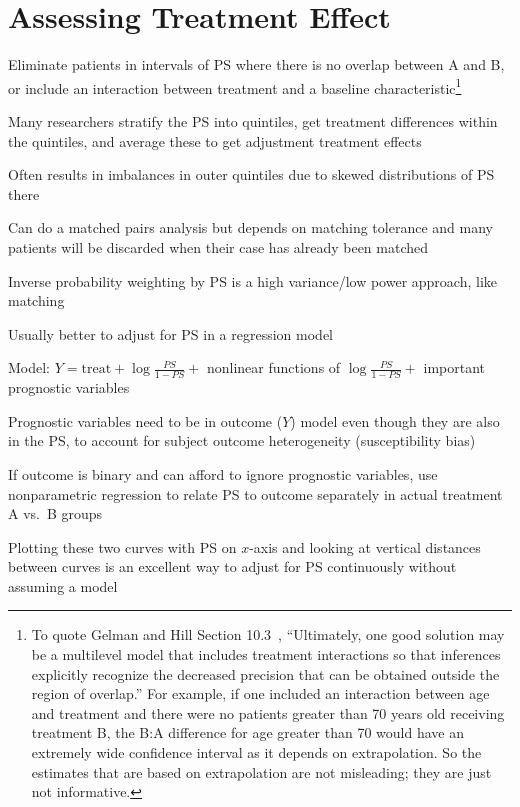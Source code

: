 \section{Assessing Treatment Effect}
\bi
\item Eliminate patients in intervals of PS where there is no overlap
  between A and B, or include an interaction between treatment and a
  baseline characteristic\footnote{To quote Gelman and
    Hill Section 10.3~\cite{gel06dat}, ``Ultimately, one good
    solution may be a multilevel model that includes treatment
    interactions so that inferences explicitly recognize the decreased
    precision that can be obtained outside the region of overlap.''  For example, if one included an interaction between age and treatment and there were no patients greater than 70 years old receiving treatment B, the B:A difference for age greater than 70 would have an extremely wide confidence interval as it depends on extrapolation.  So the estimates that are based on extrapolation are not misleading; they are just not informative.}
\item Many researchers stratify the PS into quintiles, get treatment
  differences within the quintiles, and average these to get
  adjustment treatment effects
\item Often results in imbalances in outer quintiles due to skewed
  distributions of PS there
\item Can do a matched pairs analysis but depends on matching
  tolerance and many patients will be discarded when their case has
  already been matched
\item Inverse probability weighting by PS is a high variance/low power
  approach, like matching
\item Usually better to adjust for PS in a regression model
\item Model: $Y = \textrm{treat} + \log\frac{PS}{1-PS} +$
  nonlinear functions of $\log\frac{PS}{1-PS} +$ important prognostic
    variables
\item Prognostic variables need to be in outcome ($Y$) model even
  though they are also in the PS, to account for subject outcome heterogeneity
  (susceptibility bias)
\item If outcome is binary and can afford to ignore prognostic
  variables, use nonparametric regression to relate PS to outcome
  separately in actual treatment A vs.\ B groups
\item Plotting these two curves with PS on $x$-axis and looking at
  vertical distances between curves is an excellent
  way to adjust for PS continuously without assuming a model
\ei

